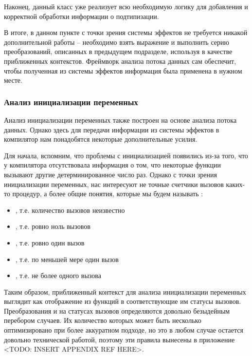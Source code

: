 Наконец, данный класс уже реализует всю необходимую логику для добавления и корректной обработки информации о подтипизации. 

В итоге, в данном пункте с точки зрения системы эффектов не требуется никакой дополнительной работы -- необходимо взять выражение и выполнить серию преобразований, описанных в предыдущем подразделе, используя  в качестве приближенных контекстов. Фреймворк анализа потока данных сам обеспечит, чтобы полученная из системы эффектов информация была применена в нужном месте.


\subsubsection{Анализ инициализации переменных}

Анализ инициализации переменных также построен на основе анализа потока данных. Однако здесь для передачи информации из системы эффектов в компилятор нам понадобятся некоторые дополнительные усилия.

Для начала, вспомним, что проблемы с инициализацией появились из-за того, что у компилятора отсутствовала информация о том, что некоторые функции вызывают другие детерминированное число раз. Однако с точки зрения инициализации переменных, нас интересуют не точные счетчики вызовов каких-то процедур, а более общие понятия, которые мы будем называть :

\begin{itemize}
  \item {}, т.е. количество вызовов неизвестно

  \item {}, т.е. ровно ноль вызовов

  \item {}, т.е. ровно один вызов

  \item {}, т.е. по меньшей мере один вызов

  \item {}, т.е. не более одного вызова
\end{itemize}

Таким образом, приближенный контекст для анализа инициализации переменных выглядит как отображение из функций в соответствующие им статусы вызовов. Преобразования  и  на статусах вызовов определяются довольно безыдейным перебором случаев. Их количество которых может быть несколько оптимизировано при более аккуратном подходе, но это в любом случае остается довольно технической работой, поэтому эти правила вынесены в приложение <TODO: INSERT APPENDIX REF HERE>.

